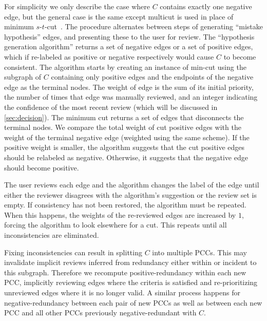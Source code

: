 \inconpcc{}

For simplicity we only describe the case where $C$ contains exactly one negative edge, but the general case is
  the same except multicut is used in place of minimum $s$-$t$-cut~\cite{vazirani_approximation_2013}.
The procedure alternates between steps of generating ``mistake hypothesis'' edges, and presenting these to the
  user for review.
The ``hypothesis generation algorithm'' returns a set of negative edges or a set of positive edges, which if
  re-labeled as positive or negative respectively would cause $C$ to become consistent.
The algorithm starts by creating an instance of min-cut using the subgraph of $C$ containing only positive edges
  and the endpoints of the negative edge as the terminal nodes.
The weight of edge is the sum of its initial priority, the number of times that edge was manually reviewed, and
  an integer indicating the confidence of the most recent review (which will be discussed in \cref{sec:decision}).
The minimum cut returns a set of edges that disconnects the terminal nodes.
We compare the total weight of cut positive edges with the weight of the terminal negative edge (weighted using
  the same scheme).
If the positive weight is smaller, the algorithm suggests that the cut positive edges should be relabeled as
  negative.
Otherwise, it suggests that the negative edge should become positive.

The user reviews each edge and the algorithm changes the label of the edge until either the reviewer disagrees
  with the algorithm's suggestion or the review set is empty.
If consistency has not been restored, the algorithm must be repeated.
When this happens, the weights of the re-reviewed edges are increased by $1$, forcing the algorithm to look
  elsewhere for a cut.
This repeats until all inconsistencies are eliminated.


Fixing inconsistencies can result in splitting $C$ into multiple PCCs.
This may invalidate implicit reviews inferred from redundancy either within or incident to this subgraph.
Therefore we recompute positive-redundancy within each new PCC, implicitly reviewing edges where the criteria is
  satisfied and re-prioritizing unreviewed edges where it is no longer valid.
A similar process happens for negative-redundancy between each pair of new PCCs as well as between each new PCC
  and all other PCCs previously negative-redundant with $C$.


